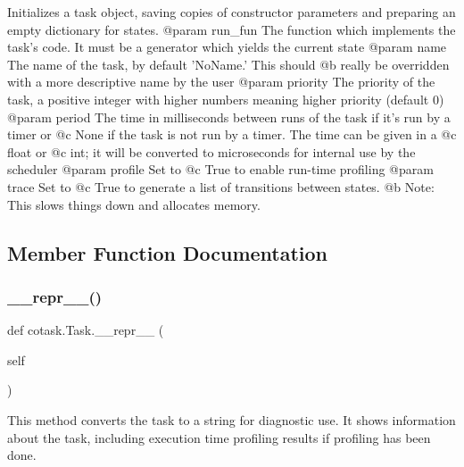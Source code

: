 \begin{DoxyVerb}Initializes a task object, saving copies of constructor parameters
and preparing an empty dictionary for states. 
@param run_fun The function which implements the task's code. It must
    be a generator which yields the current state
@param name The name of the task, by default 'NoName.' This should
    @b really be overridden with a more descriptive name by the user
@param priority The priority of the task, a positive integer with
    higher numbers meaning higher priority (default 0)
@param period The time in milliseconds between runs of the task if 
    it's run by a timer or @c None if the task is not run by a timer.
    The time can be given in a @c float or @c int; it will be 
    converted to microseconds for internal use by the scheduler
@param profile Set to @c True to enable run-time profiling 
@param trace Set to @c True to generate a list of transitions between
    states. @b Note: This slows things down and allocates memory. \end{DoxyVerb}
 

\subsection{Member Function Documentation}
\mbox{\label{classcotask_1_1_task_a2dcb50b9bf2676dfaac176649bc7d3f9}} 
\subsubsection{\texorpdfstring{\_\_repr\_\_()}{\_\_repr\_\_()}}
{\footnotesize\ttfamily def cotask.\+Task.\+\_\+\+\_\+repr\+\_\+\+\_\+ (\begin{DoxyParamCaption}\item[{}]{self }\end{DoxyParamCaption})}

\begin{DoxyVerb}This method converts the task to a string for diagnostic use.
It shows information about the task, including execution time
profiling results if profiling has been done. \end{DoxyVerb}
 \mbox{\label{classcotask_1_1_task_a6e51a228f985aec8c752bd72a73730ae}} 

